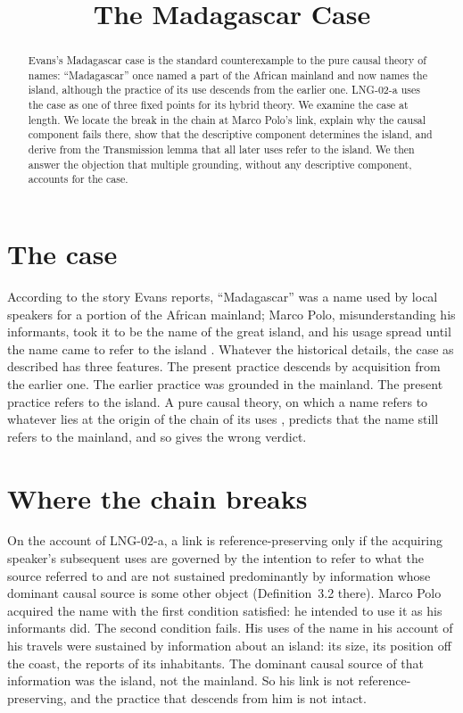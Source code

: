 \documentclass{situationist-preprint}
\title{The Madagascar Case}
\begin{document}
\maketitle

\begin{abstract}
Evans's Madagascar case is the standard counterexample to the pure causal theory of names: \enquote{Madagascar} once named a part of the African mainland and now names the island, although the practice of its use descends from the earlier one. LNG-02-a uses the case as one of three fixed points for its hybrid theory. We examine the case at length. We locate the break in the chain at Marco Polo's link, explain why the causal component fails there, show that the descriptive component determines the island, and derive from the Transmission lemma that all later uses refer to the island. We then answer the objection that multiple grounding, without any descriptive component, accounts for the case.
\end{abstract}

\section{The case}

According to the story Evans reports, \enquote{Madagascar} was a name used by local speakers for a portion of the African mainland; Marco Polo, misunderstanding his informants, took it to be the name of the great island, and his usage spread until the name came to refer to the island \citep{Evans1973}. Whatever the historical details, the case as described has three features. The present practice descends by acquisition from the earlier one. The earlier practice was grounded in the mainland. The present practice refers to the island. A pure causal theory, on which a name refers to whatever lies at the origin of the chain of its uses \citep{Kripke1980}, predicts that the name still refers to the mainland, and so gives the wrong verdict.

\section{Where the chain breaks}

On the account of LNG-02-a, a link is reference-preserving only if the acquiring speaker's subsequent uses are governed by the intention to refer to what the source referred to and are not sustained predominantly by information whose dominant causal source is some other object (Definition~3.2 there). Marco Polo acquired the name with the first condition satisfied: he intended to use it as his informants did. The second condition fails. His uses of the name in his account of his travels were sustained by information about an island: its size, its position off the coast, the reports of its inhabitants. The dominant causal source of that information was the island, not the mainland. So his link is not reference-preserving, and the practice that descends from him is not intact.
\end{document}
